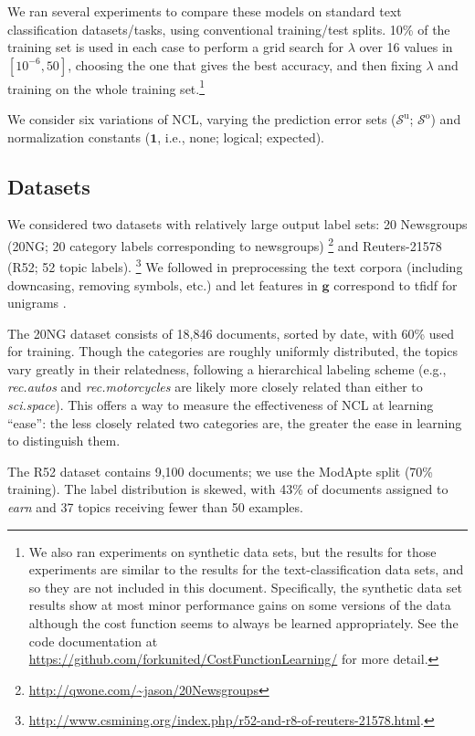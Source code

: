 \documentclass{article} %
\newcommand{\unorderedS}{\mathcal{S}^{\mathrm{u}}}
\newcommand{\orderedS}{\mathcal{S}^{\mathrm{o}}}
\newcommand{\ourmethod}{NCL}
\begin{document}
We ran several experiments to compare these models on standard text
classification datasets/tasks, using conventional training/test splits.
10\% of the training set is used in each case to perform a grid search
for $\lambda$ over 16 values in $[10^{-6}, 50]$, choosing the one that
gives the best accuracy, and then fixing $\lambda$ and
training on the whole training set.\footnote{We also ran experiments
on synthetic data sets, but the results for those experiments are similar
to the results for the text-classification data sets, and 
so they are not included in this document. Specifically, the synthetic data
set results show at most minor performance gains on some versions of the data
although the cost function seems to always be learned appropriately.
 See the code documentation
at \url{https://github.com/forkunited/CostFunctionLearning/} for more 
detail.}

We consider six variations of \ourmethod{}, varying the prediction error sets
($\unorderedS$; $\orderedS$) and normalization constants
($\boldsymbol{1}$, i.e., none; logical; expected).

\subsection{Datasets}

We considered two datasets with relatively large output label sets:
20 Newsgroups (20NG; 20 category labels corresponding to newsgroups)
\footnote{\url{http://qwone.com/~jason/20Newsgroups}} and Reuters-21578
(R52; 52 topic labels).
\footnote{\url{http://www.csmining.org/index.php/r52-and-r8-of-reuters-21578.html}.}    
We followed \citep{2007:phd-Ana-Cardoso-Cachopo} in
preprocessing the text corpora (including downcasing, removing
symbols, etc.) and let features in $\mathbf{g}$ correspond to tfidf 
for unigrams \citep{lan2006proposing}.

The 20NG dataset consists of 18,846 documents, sorted by date, with
60\% used for training.  Though the categories are roughly uniformly
distributed, the topics vary greatly in their relatedness, following a
hierarchical labeling scheme (e.g., \emph{rec.autos} and
\emph{rec.motorcycles} are likely more closely related than either to
\emph{sci.space}).  This offers a way to measure the effectiveness of
\ourmethod{} at learning ``ease'':   the less closely related two 
categories are, the greater the ease in learning to distinguish them.

The R52 dataset contains 9,100 documents; we use the ModApte split
(70\% training).  The label distribution is skewed, with 43\% of
documents assigned to \emph{earn} and 37 topics
receiving fewer than 50 examples.
\end{document}
